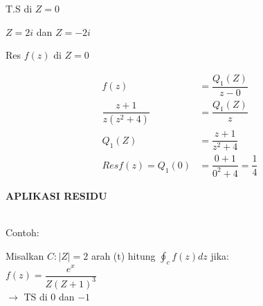\documentclass{article}
\begin{document}
T.S di $Z=0$

$Z=2i$ dan $Z=-2i$

Res $f(z)$ di $Z=0$

\begin{align}
    f(z)                  & = \dfrac{Q_1(Z)}{z-0}
    \nonumber                                                   \\
    \dfrac{z+1}{z(z^2+4)} & = \dfrac{Q_1(Z)}{z}
    \nonumber                                                   \\
    Q_1(Z)                & = \dfrac{z+1}{z^2+4}
    \nonumber                                                   \\
    Res f(z) = Q_1(0)     & = \dfrac{0+1}{0^2+4} = \dfrac{1}{4}
    \nonumber
\end{align}



\newpage
\begin{center}
    \textbf{APLIKASI RESIDU}
\end{center}
\leavevmode\\

Contoh:

Misalkan $C:|Z|=2$ arah (t) hitung $\oint_c f(z)dz$ jika:
\\

$f(z) = \dfrac{e^x}{Z(Z+1)^3}$
\\

$\rightarrow$ TS di $0$ dan $-1$
\\
\end{document}
